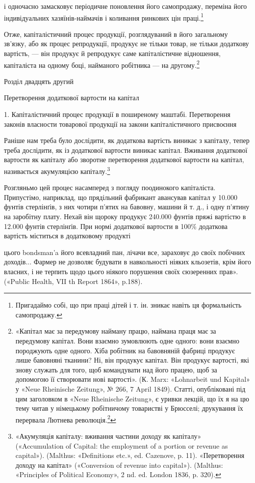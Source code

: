 і одночасно замасковує періодичне поновлення його самопродажу,
переміна його індивідуальних хазяїнів-наймачів і коливання
ринкових цін праці.\footnote{
Пригадаймо собі, що при праці дітей і т. ін. зникає навіть ця формальність
самопродажу.
}

Отже, капіталістичний процес продукції, розглядуваний в
його загальному зв’язку, або як процес репродукції, продукує
не тільки товар, не тільки додаткову вартість, — він продукує
й репродукує саме капіталістичне відношення, капіталіста на
одному боці, найманого робітника — на другому.\footnote{
«Капітал має за передумову найману працю, наймана праця має за передумову капітал. Вони взаємно
зумовлюють одне одного: вони взаємно породжують одне одного. Хіба робітник на бавовняній фабриці
продукує лише бавовняні тканини? Ні, він продукує капітал. Він продукує вартості, які знову служать
для того, щоб командувати над його працею, щоб за допомогою її створювати нові вартості». (К. Marx:
«Lohnarbeit und Kapital» у «Neue Rheinische Zeitung», № 266, 7 April 1849). Статті, опубліковані під
цим заголовком в «Neue Rheinische Zeitung», є уривки лекцій, що їх я на цю тему читав у німецькому
робітничому товаристві у Брюсселі; друкування їх перервала Лютнева
революція.\footnote*{
Статті ці з’явилися потім окремою брошурою і під тією ж назвою.
Є українське видання: Партвидав «Пролетар» 1932 р. Ред.
}
}

Розділ двадцять другий

Перетворення додаткової вартости на капітал

1. Капіталістичний процес продукції в поширеному маштабі.
Перетворення законів власности товарової продукції на закони
капіталістичного присвоєння

Раніше нам треба було дослідити, як додаткова вартість виникає
з капіталу, тепер треба дослідити, як із додаткової вартости
виникає капітал. Вживання додаткової вартости як капіталу
або зворотне перетворення додаткової вартости на капітал, називається
акумуляцією капіталу.\footnote{
«Акумуляція капіталу: вживання частини доходу як капіталу» («Accumulation of Capital: the
employment of a portion or revenue as capital»). (Malthus: «Definitions etc.», ed. Cazenove, p. 11).
«Перетворення доходу на капітал» («Conversion of revenue into capital»).
(Malthus: «Principles of Political Economy», 2 nd. ed. London 1836, p. 320).
}

Розгляньмо цей процес насамперед з погляду поодинокого капіталіста. Припустімо, наприклад, що
прядільний фабрикант авансував капітал у 10.000 фунтів стерлінґів, з них чотири п’ятих на бавовну,
машини й т. д., і одну п’ятину на заробітну плату. Нехай він щороку продукує 240.000 фунтів пряжі
вартістю в 12.000 фунтів стерлінґів. При нормі додаткової вартости в 100\% додаткова вартість
міститься в додатковому продукті

цього bondsman’a його всевладний пан, лічачи все, зараховує до своїх побічних доходів... Фармер не
дозволяє будувати в навкольності ніяких кльозетів, крім його власних, і не терпить щодо цього
ніякого порушення своїх сюзеренних прав». («Public Health, VII th Report 1864», p.188).